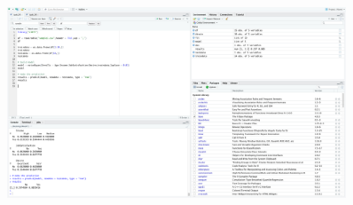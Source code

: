 \documentclass{article}
\begin{document}
\begin{figure}[H]
    \includegraphics[width=0.9\textwidth]{Fig3}
\end{figure}
\end{document}
